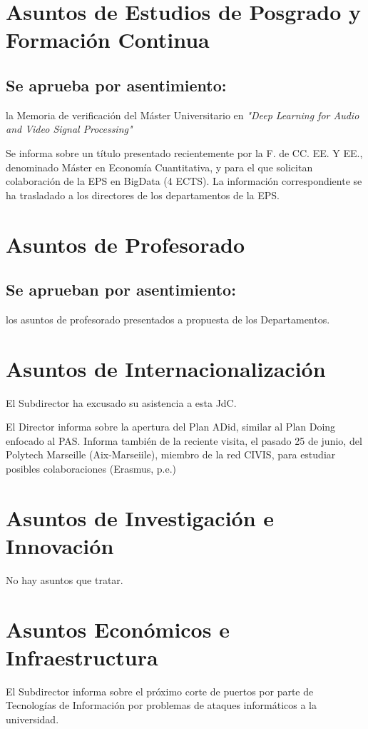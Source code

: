 \documentclass[numerado]{plantillasEPS} %
\begin{document}
\section{Asuntos de Estudios de Posgrado y Formación Continua} 
\subsection{Se  aprueba  por  asentimiento:}  la  Memoria  de  verificación  del  Máster  Universitario  en \textit{"Deep Learning for Audio and Video Signal Processing"}

Se  informa  sobre  un  título  presentado  recientemente  por  la  F.  de  CC.  EE.  Y  EE., denominado Máster en Economía Cuantitativa, y para el que solicitan colaboración de la EPS  en  BigData  (4  ECTS).  La  información  correspondiente  se  ha  trasladado  a  los directores de los departamentos de la EPS.

\section{Asuntos de Profesorado}
\subsection{Se aprueban por asentimiento:} los asuntos de profesorado presentados a propuesta de los Departamentos.

\section{Asuntos de Internacionalización}
El Subdirector ha excusado su asistencia a esta JdC. 

El  Director  informa  sobre  la  apertura  del  Plan  ADid,  similar  al  Plan  Doing  enfocado  al PAS. Informa también de la reciente visita, el pasado 25 de junio, del Polytech Marseille (Aix-Marseiile),   miembro   de   la   red   CIVIS,   para   estudiar   posibles   colaboraciones (Erasmus, p.e.)
\section{Asuntos de Investigación e Innovación}
No hay asuntos que tratar. 
\section{Asuntos Económicos e Infraestructura}
El  Subdirector  informa  sobre  el  próximo  corte  de  puertos  por  parte  de  Tecnologías  de Información por problemas de ataques informáticos a la universidad.
\end{document}
